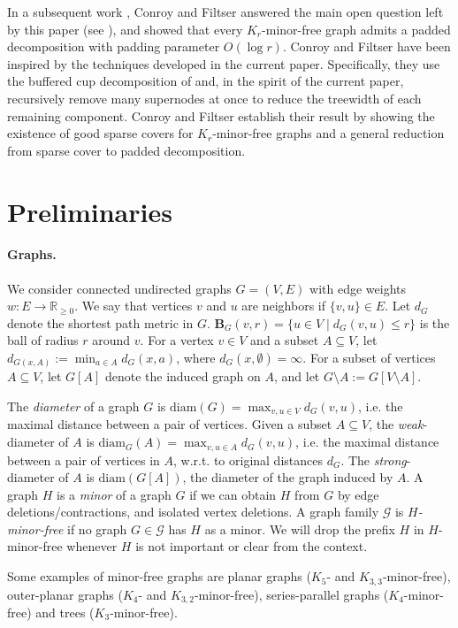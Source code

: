 \documentclass{article}
\newcommand{\R}{\mathbb{R}}
\newcommand{\diam}{\mathrm{diam}}
\def\ball{\mathbf{B}}
\begin{document}
In a subsequent work \cite{CF25}, Conroy and Filtser answered the main open question left by this paper (see ), and showed that every $K_{r}$-minor-free graph admits a padded decomposition with padding parameter $O(\log r)$. Conroy and Filtser have been inspired by the techniques developed in the current paper. Specifically, they use the buffered cup decomposition of \cite{CCL+24} and, in the spirit of the current paper, recursively remove many supernodes at once to reduce the treewidth of each remaining component. Conroy and Filtser establish their result by showing the existence of good sparse covers for $K_{r}$-minor-free graphs and a general reduction from sparse cover to padded decomposition.

\section{Preliminaries}
\paragraph*{Graphs.}
We consider connected undirected graphs $G=(V,E)$ with edge weights $w: E \to \R_{\ge 0}$. We say that vertices $v$ and $u$ are neighbors if $\{v,u\}\in E$. Let $d_{G}$ denote the shortest path metric in $G$. $\ball_G(v,r)=\{u\in V\mid d_G(v,u)\le r\}$ is the ball of radius $r$ around $v$. For a vertex $v\in V$ and a subset $A\subseteq V$, let $d_{G(x,A)}:=\min_{a\in A}d_G(x,a)$, where $d_{G}(x,\emptyset)= \infty$. For a subset of vertices $A\subseteq V$, let $G[A]$ denote the induced graph on $A$, and let $G\setminus A := G[V\setminus A]$.

The \emph{diameter} of a graph $G$ is $\diam(G)=\max_{v,u\in V}d_G(v,u)$, i.e. the maximal distance between a pair of vertices.
Given a subset $A\subseteq V$, the \emph{weak}-diameter of $A$ is $\diam_G(A)=\max_{v,u\in A}d_G(v,u)$, i.e. the maximal distance between a pair of vertices in $A$, w.r.t. to original distances $d_G$. The \emph{strong}-diameter of $A$ is $\diam(G[A])$, the diameter of the graph induced by $A$. 
A graph $H$ is a \emph{minor} of a graph $G$ if we can obtain $H$ from
$G$ by edge deletions/contractions, and isolated vertex deletions.  A graph
family $\mathcal{G}$ is \emph{$H$-minor-free} if no graph
$G\in\mathcal{G}$ has $H$ as a minor. We will drop the prefix $H$ in $H$-minor-free whenever $H$ is not important or clear from the context. 

Some examples of minor-free graphs are planar graphs ($K_5$- and $K_{3,3}$-minor-free), outer-planar graphs ($K_4$- and $K_{3,2}$-minor-free), series-parallel graphs ($K_4$-minor-free) and trees ($K_3$-minor-free).
\end{document}
